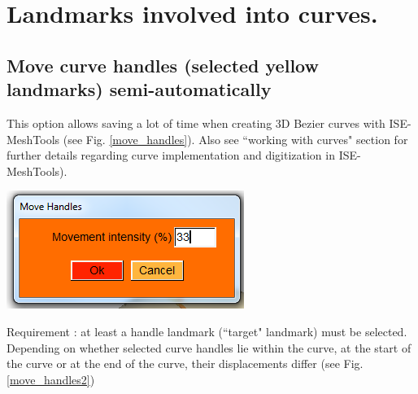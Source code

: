 \section{Landmarks involved into curves.}

\subsection{Move curve handles (selected yellow
landmarks) semi-automatically}
\noindent
\begin{minipage}{0.5\textwidth}
This option allows saving a lot of time when creating
3D Bezier curves with ISE-MeshTools (see Fig. \ref{move_handles}). Also see ``working
with curves" section for further details regarding curve
implementation and digitization in ISE-MeshTools).
\end{minipage}    
\begin{minipage}{0.5\textwidth}\centering
  \includegraphics[scale=0.5]{images/Edit_selected_landmarks/Move.png}
 \end{minipage} 
\noindent



Requirement : at least a handle landmark (``target" landmark) must be selected.
Depending on whether selected curve handles lie within the curve, at the start of the curve or at the
end of the curve, their displacements differ (see Fig. \ref{move_handles2})



